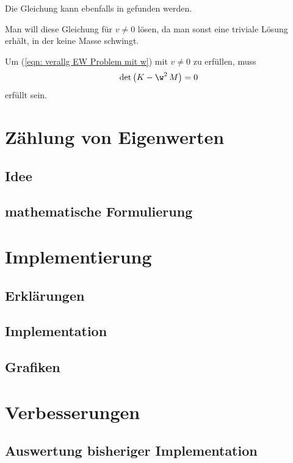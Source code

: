 \documentclass[a4paper,12pt]{report}
\newcommand{\klammer}[1]{\left(#1\right)}
\theoremstyle{plain} %
\theoremstyle{definition} %
\theoremstyle{remark}
\begin{document}
            Die Gleichung kann ebenfalls in \cite[S. 380]{maschinendynamikDresig} gefunden werden.

            Man will diese Gleichung für $v\ne 0$ lösen, da man sonst eine triviale Lösung erhält, in der keine Masse schwingt.


            Um (\ref{eqn: verallg EW Problem mit w}) mit $v\ne 0$ zu erfüllen, muss
            $$\det\klammer{K-\w^2\,M} = 0$$
            erfüllt sein.

\chapter{Zählung von Eigenwerten}
\label{sec: EW Zählung}

      \section{Idee}
      \section{mathematische Formulierung}

\chapter{Implementierung}
\label{sec: Programmieren}
      \section{Erklärungen}

      \section{Implementation}

      \section{Grafiken}

\chapter{Verbesserungen}
\label{sec: Verbesserungen}
      \section{Auswertung bisheriger Implementation}
\end{document}
